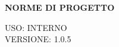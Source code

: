 \documentclass[5pt]{article}
\begin{document}
\vspace{24pt}

\begin{center}
	\textbf{\Large NORME DI PROGETTO }
\end{center}

\vspace{13pt}

\begin{flushright}
	\begin{spacing}{1}
		USO: INTERNO\\
		VERSIONE: 1.0.5\\
	\end{spacing}
\end{flushright}


\restoregeometry

\pagebreak


\pagebreak
\end{document}
